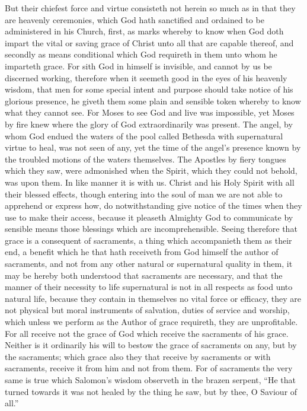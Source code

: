 But their chiefest force and virtue consisteth not herein so much as in that they are heavenly ceremonies, which God hath sanctified and ordained to be administered in his Church, first, as marks whereby to know when God doth impart the vital or saving grace of Christ unto all that are capable thereof, and secondly as means conditional which  God requireth in them unto whom he imparteth grace. For sith God in himself is invisible, and cannot by us be discerned working, therefore when it seemeth good in the eyes of his heavenly wisdom, that men for some special intent and purpose should take notice of his glorious presence, he giveth them some plain and sensible token whereby to know what they cannot see. For Moses to see God and live was impossible, yet Moses by fire knew where the glory of God extraordinarily was present. The angel, by whom God endued the waters of the pool called Bethesda with supernatural virtue to heal, was not seen of any, yet the time of the angel’s presence known by the troubled motions of the waters themselves. The Apostles by fiery tongues which they saw, were admonished when the Spirit, which they could not behold, was upon them. In like manner it is with us. Christ and his Holy Spirit with all their blessed effects, though entering into the soul of man we are not able to apprehend or express how, do notwithstanding give notice of the times when they use to make their access, because it pleaseth Almighty God to communicate by sensible means those blessings which are incomprehensible.
Seeing therefore that grace is a consequent of sacraments, a thing which accompanieth them as their end, a benefit which he that hath receiveth from God himself the author of sacraments, and not from any other natural or supernatural quality in them, it may be hereby both understood that sacraments are necessary, and that the manner of their necessity to life supernatural is not in all respects as food unto natural life, because they contain in themselves no vital force or efficacy, they are not physical but moral instruments of salvation, duties of service and worship, which unless we perform as the Author of grace requireth, they are unprofitable. For  all receive not the grace of God which receive the sacraments of his grace. Neither is it ordinarily his will to bestow the grace of sacraments on any, but by the sacraments; which grace also they that receive by sacraments or with sacraments, receive it from him and not from them. For of sacraments the very same is true which Salomon’s wisdom observeth in the brazen serpent, “He that turned towards it was not healed by the thing he saw, but by thee, O Saviour of all.”
